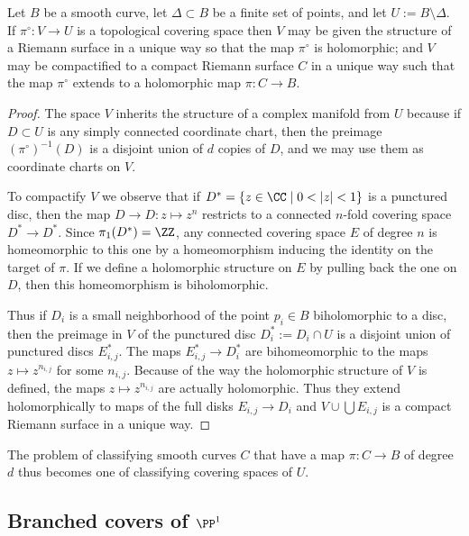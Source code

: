 \begin{theorem}
 Let $B$ be a smooth curve, let $\Delta\subset B$ be a finite set of points, and let $U := B\setminus \Delta$.
If $\pi^\circ : V \to U$ is a topological covering space then $V$ may be given the structure of a Riemann surface in a unique way so that the map $\pi^\circ$ is holomorphic; and $V$ may be compactified to a compact Riemann surface $C$ in a unique way such that the map $\pi^\circ$ extends to a holomorphic map $\pi : C \to B$.
\end{theorem} 

\begin{proof}
The space $V$ inherits the structure of a complex manifold from $U$ because if $D \subset U$ is any simply connected coordinate chart, then the preimage $({\pi^\circ})^{-1}(D)$ is a disjoint union of $d$ copies of $D$, and we may use them as coordinate charts on $V$. 
   
To compactify $V$ we observe that if $D^* = \{ z \in \CC \mid 0 < |z| < 1 \}$ is a punctured disc, then
the map $D\to D: z \mapsto z^n$ restricts to a connected $n$-fold covering space $D^*\to D^*$. 
Since $\pi_1(D^*) = \ZZ$, any connected covering space $E$ of degree $n$ is homeomorphic to this one
by a homeomorphism inducing the identity on the target of $\pi$.
If we  define a holomorphic structure on $E$ by pulling back the one on $D$, then
this homeomorphism is biholomorphic.

Thus if $D_i$ is a small neighborhood of the point $p_i \in B$ biholomorphic to a disc, then the preimage  in $V$ of the punctured disc $D_i^* := D_i \cap U$ is a disjoint union of punctured discs $E_{i,j}^{*}$. The maps $E^{*}_{i,j} \to D_{i}^{*}$
are bihomeomorphic to the maps $z\mapsto z^{n_{i,j}}$ for some $n_{i,j}$. Because of the way the holomorphic structure
of $V$ is defined, the maps $z\mapsto z^{n_{i,j}}$ are actually holomorphic. Thus they extend holomorphically
to maps of the full disks $E_{i,j}\to D_{i}$ and $V\cup \bigcup E_{i,j}$ is a compact Riemann surface in a unique way. \end{proof}
   
 The problem of classifying smooth curves $C$ that have a map $\pi : C \to B$ of degree $d$ thus becomes one of classifying covering spaces of $U$. 
    
 \subsection{Branched covers of $\PP^1$} 

